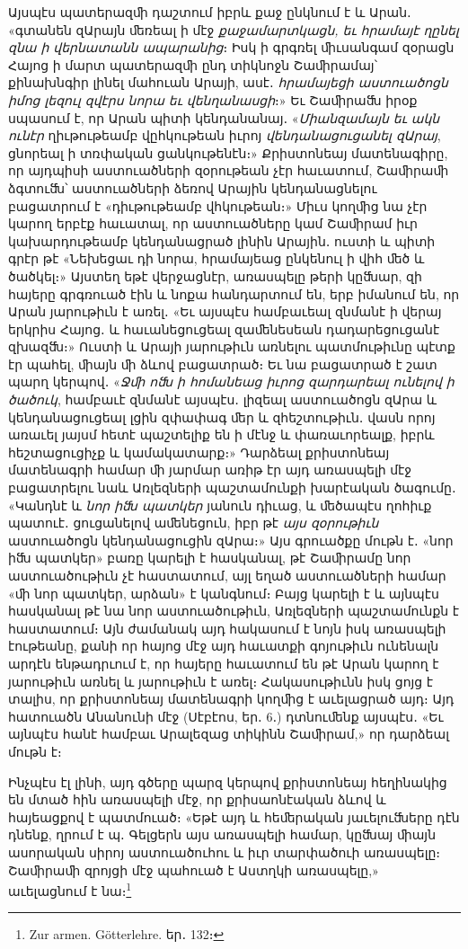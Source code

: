 \documentclass{article}
\begin{document}
{Այսպէս պատերազﬕ դաշտում իբրև քաջ ընկնում է և Արան․ «գտանեն զԱրայն ﬔռեալ ի մէջ \emph{քաջամարտկացն, եւ հրամայէ ղընել զնա ի վերնատանն ապարանից}։ Իսկ ի գրգռել ﬕւսանգամ զօրացն Հայոց ի մարտ պատերազﬕ ընդ տիկնոջն Շաﬕրամայ՝ քինախնգիր լինել մահուան Արայի, ասէ․ \emph{հրամայեցի աստուածոցն իմոց լեզուլ զվէրս նորա եւ վենղանասցի}։» Եւ Շաﬕրաﬓ իրօք սպասում է, որ Արան պիտի կենդանանայ․ «\emph{Միանզամայն եւ ակն ունէր} ղիւթութեամբ վըհկութեան իւրոյ \emph{վենդանացուցանել զԱրայ}, ցնորեալ ի տռփական ցանկութենէն։» Քրիստոնեայ մատենագիրը, որ այդպիսի աստուածների զօրութեան չէր հաւատում, Շաﬕրաﬕ ձգտուﬓ՝ աստուածների ձեռով Արային կենդանացնելու բացատրում է «դիւթութեամբ վհկութեան։» Միւս կողﬕց նա չէր կարող երբէք հաւատալ, որ աստուածները կամ Շաﬕրամ իւր կախարդութեամբ կենդանացրած լինին Արային․ ուստի և պիտի գրէր թէ «Նեխեցաւ դի նորա, հրամայեաց ընկենուլ ի վիհ ﬔծ և ծածկել։» Այստեղ եթէ վերջացնէր, առասպելը թերի կըﬓար, զի հայերը գրգռուած էին և նոքա հանդարտում են, երբ իմանում են, որ Արան յարութիւն է առել․ «Եւ այսպէս համբաւեալ զնմանէ ի վերայ երկրիս Հայոց․ և հաւանեցուցեալ զաﬔնեսեան դադարեցուցանէ զխազﬓ։» Ուստի և Արայի յարութիւն առնելու պատմութիւնը պէտք էր պահել, ﬕայն ﬕ ձևով բացատրած։ Եւ նա բացատրած է շատ պարղ կերպով․ «\emph{Ջﬕ ոﬓ ի հոմանեաց իւրոց զարդարեալ ունելով ի ծածուկ}, համբաւէ զնմանէ այսպէս․ լիզեալ աստուածոցն զԱրա և կենդանացուցեալ լցին զփափագ ﬔր և զհեշտութիւն․ վասն որոյ առաւել յայսմ հետէ պաշտելիք են ի մէնջ և փառաւորեալք, իբրև հեշտացուցիչք և կամակատարք։» Դարձեալ քրիստոնեայ մատենագրի համար ﬕ յարմար առիթ էր այդ առասպելի մէջ բացատրելու նաև Առլեզների պաշտամունքի խարէական ծագումը․ «Կանդնէ և \emph{նոր իﬓ պատկեր} յանուն դիւաց, և ﬔծապէս ղոհիւք պատուէ․ ցուցանելով աﬔնեցուն, իբր թէ \emph{այս զօրութիւն} աստուածոցն կենդանացուցին զԱրա։» Այս գրուածքը մութն է․ «նոր իﬓ պատկեր» բառը կարելի է հասկանալ, թէ Շաﬕրամը նոր աստուածութիւն չէ հաստատում, այլ եղած աստուածների համար «ﬕ նոր պատկեր, արձան» է կանգնում։ Բայց կարելի է և այնպէս հասկանալ թէ նա նոր աստուածութիւն, Առլեզների պաշտամունքն է հաստատում։ Այն ժամանակ այդ հակասում է նոյն իսկ առասպելի էութեանը, քանի որ հայոց մէջ այդ հաւատքի գոյութիւն ունենալն արդէն ենթադրւում է, որ հայերը հաւատում են թէ Արան կարող է յարութիւն առնել և յարութիւն է առել։ Հակասութիւնն իսկ ցոյց է տալիս, որ քրիստոնեայ մատենագրի կողﬕց է աւելացրած այդ։ Այդ հատուածն Անանունի մէջ (Սէբէոս, եր․ 6․) դտնուﬔնք այսպէս․ «Եւ այնպէս հանէ համբաւ Արալեզաց տիկինն Շաﬕրամ,» որ դարձեալ մութն է։

Ինչպէս էլ լինի, այդ գծերը պարզ կերպով քրիստոնեայ հեղինակից են մտած հին առասպելի մէջ, որ քրիսաոնէական ձևով և հայեացքով է պատմուած։ «Եթէ այդ և հեﬔրական յաւելուﬓերը դէն դնենք, ղրում է պ․ Գելցերն այս առասպելի համար, կըﬓայ ﬕայն ասորական սիրոյ աստուածուհու և իւր տարփածուի առասպելը։ Շաﬕրաﬕ զրոյցի մէջ պահուած է Աստղկի առասպելը,» աւելացնում է նա։\footnote{Zur armen. Götterlehre. եր․ 132։}

}
\end{document}
